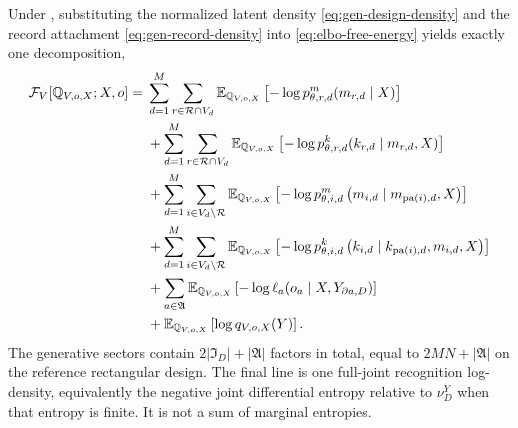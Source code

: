 Under , substituting the normalized latent density \eqref{eq:gen-design-density} and the record attachment \eqref{eq:gen-record-density} into \eqref{eq:elbo-free-energy} yields exactly one decomposition,
\begin{align}
\mathcal F_V[\mathbb Q_{V,o,X};X,o]
={}&
\sum_{d=1}^{M}\sum_{r\in\mathcal R\cap V_d}
\mathbb E_{\mathbb Q_{V,o,X}}\left[
-\log p_{\theta,r,d}^{m}(m_{r,d}\mid X)
\right]
\label{eq:elbo-factorization}\\
&+\sum_{d=1}^{M}\sum_{r\in\mathcal R\cap V_d}
\mathbb E_{\mathbb Q_{V,o,X}}\left[
-\log p_{\theta,r,d}^{k}(k_{r,d}\mid m_{r,d},X)
\right]\notag\\
&+\sum_{d=1}^{M}\sum_{i\in V_d\setminus\mathcal R}
\mathbb E_{\mathbb Q_{V,o,X}}\left[
-\log p_{\theta,i,d}^{m}
\left(m_{i,d}\mid m_{\operatorname{pa}(i),d},X\right)
\right]\notag\\
&+\sum_{d=1}^{M}\sum_{i\in V_d\setminus\mathcal R}
\mathbb E_{\mathbb Q_{V,o,X}}\left[
-\log p_{\theta,i,d}^{k}
\left(k_{i,d}\mid k_{\operatorname{pa}(i),d},m_{i,d},X\right)
\right]\notag\\
&+\sum_{a\in\mathfrak A}
\mathbb E_{\mathbb Q_{V,o,X}}\left[
-\log\ell_a(o_a\mid X,Y_{\partial a,D})
\right]\notag\\
&+\mathbb E_{\mathbb Q_{V,o,X}}\left[
\log q_{V,o,X}(Y)
\right].\notag
\end{align}
The generative sectors contain \(2|\mathfrak I_D|+|\mathfrak A|\) factors in total, equal to \(2MN+|\mathfrak A|\) on the reference rectangular design. The final line is one full-joint recognition log-density, equivalently the negative joint differential entropy relative to \(\nu_D^Y\) when that entropy is finite. It is not a sum of marginal entropies. 


